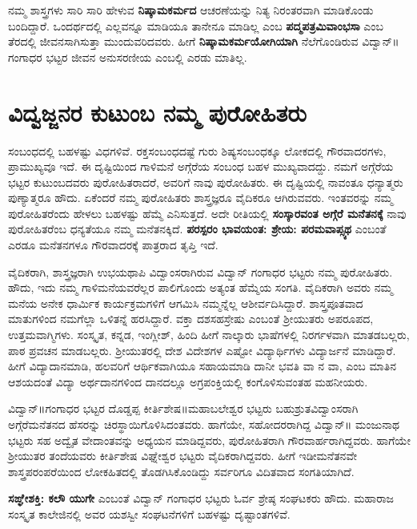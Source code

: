 {ನಮ್ಮ ಶಾಸ್ತ್ರಗಳು ಸಾರಿ  \enginline{-}  ಸಾರಿ ಹೇಳುವ \textbf{ನಿಷ್ಕಾಮಕರ್ಮದ} ಆಚರಣೆಯನ್ನು ನಿತ್ಯ  \enginline{-}  ನಿರಂತರವಾಗಿ ಮಾಡಿಕೊಂಡು ಬಂದಿದ್ದಾರೆ. ಒಂದರ್ಥದಲ್ಲಿ ಎಲ್ಲವನ್ನೂ ಮಾಡಿಯೂ ತಾನೇನೂ ಮಾಡಿಲ್ಲ ಎಂಬ \textbf{ಪದ್ಮಪತ್ರಮಿವಾಂಭಸಾ} ಎಂಬ ತೆರದಲ್ಲಿ ಜೀವನಸಾಗಿಸುತ್ತಾ ಮುಂದುವರಿದವರು. ಹೀಗೆ \textbf{ನಿಷ್ಕಾಮಕರ್ಮಯೋಗಿಯಾಗಿ} ನೆಲೆಗೊಂಡಿರುವ ವಿದ್ವಾನ್॥ಗಂಗಾಧರ ಭಟ್ಟರ ಜೀವನ ಅನುಸರಣೀಯ ಎಂಬಲ್ಲಿ ಎರಡು ಮಾತಿಲ್ಲ.

\section*{ವಿದ್ವಜ್ಜನರ ಕುಟುಂಬ   \enginline{-}   ನಮ್ಮ ಪುರೋಹಿತರು}

ಸಂಬಂಧದಲ್ಲಿ ಬಹಳಷ್ಟು ವಿಧಗಳಿವೆ. ರಕ್ತಸಂಬಂಧದಷ್ಟೆ ಗುರು  \enginline{-}  ಶಿಷ್ಯಸಂಬಂಧಕ್ಕೂ ಲೋಕದಲ್ಲಿ ಗೌರವಾದರಗಳು, ಪ್ರಾಮುಖ್ಯವೂ ಇದೆ. ಈ ದೃಷ್ಟಿಯಿಂದ ಗಾಳಿಮನೆ  \enginline{-}  ಅಗ್ಗೆರೆಯ ಸಂಬಂಧ ಬಹಳ ಮುಖ್ಯವಾದದ್ದು.  ನಮಗೆ ಅಗ್ಗೆರೆಯ ಭಟ್ಟರ ಕುಟುಂಬದವರು ಪುರೋಹಿತರಾದರೆ, ಅವರಿಗೆ ನಾವು ಪುರೋಹಿತರು. ಈ ದೃಷ್ಟಿಯಲ್ಲಿ ನಾವಂತೂ ಧನ್ಯಾತ್ಮರು  \enginline{-}  ಪುಣ್ಯಾತ್ಮರೂ ಹೌದು. ಏಕೆಂದರೆ ನಮ್ಮ ಪುರೋಹಿತರು ಶಾಸ್ತ್ರಜ್ಞರೂ  \enginline{-}  ವೈದಿಕರೂ ಆಗಿರುವವರು. ಇಂತವರನ್ನು ನಮ್ಮ ಪುರೋಹಿತರೆಂದು ಹೇಳಲು ಬಹಳಷ್ಟು ಹೆಮ್ಮೆ ಎನಿಸುತ್ತದೆ. ಅದೇ ರೀತಿಯಲ್ಲಿ \textbf{ಸಂಸ್ಕಾರವಂತ  \enginline{-}   ಅಗ್ಗೆರೆ ಮನೆತನಕ್ಕೆ} ನಾವು ಪುರೋಹಿತರೆಂಬ ಧನ್ಯತೆಯೂ ನಮ್ಮ ಮನೆತನಕ್ಕಿದೆ. \textbf{ಪರಸ್ಪರಂ ಭಾವಯಂತ: ಶ್ರೇಯ: ಪರಮವಾಪ್ಸ್ಯಥ}  ಎಂಬಂತೆ ಎರಡೂ ಮನೆತನಗಳೂ ಗೌರವಾದರಕ್ಕೆ ಪಾತ್ರರಾದ ತೃಪ್ತಿ ಇದೆ. 

ವೈದಿಕರಾಗಿ, ಶಾಸ್ತ್ರಜ್ಞರಾಗಿ ಉಭಯಥಾಪಿ ವಿದ್ವಾಂಸರಾಗಿರುವ ವಿದ್ವಾನ್ ಗಂಗಾಧರ ಭಟ್ಟರು ನಮ್ಮ ಪುರೋಹಿತರು. ಹೌದು, ಇದು ನಮ್ಮ ಗಾಳಿಮನೆಯವರೆಲ್ಲರ ಪಾಲಿಗೊಂದು ಅತ್ಯಂತ ಹೆಮ್ಮೆಯ ಸಂಗತಿ. ವೈದಿಕರಾಗಿ ಅವರು ನಮ್ಮ ಮನೆಯ ಅನೇಕ ಧಾರ್ಮಿಕ ಕಾರ್ಯಕ್ರಮಗಳಿಗೆ ಆಗಮಿಸಿ ನಮ್ಮನ್ನೆಲ್ಲ ಆಶೀರ್ವದಿಸಿದ್ದಾರೆ. ಶಾಸ್ತ್ರಪೂತವಾದ ಮಾತುಗಳಿಂದ ನಮಗೆಲ್ಲಾ ಒಳಿತನ್ನೆ ಹರಸಿದ್ದಾರೆ. ವಕ್ತಾ ದಶಸಹಸ್ರೇಷು ಎಂಬಂತೆ ಶ್ರೀಯುತರು ಅಪರೂಪದ, ಉತ್ತಮವಾಗ್ಮಿಗಳು. ಸಂಸ್ಕೃತ, ಕನ್ನಡ, ಇಂಗ್ಲೀಶ್, ಹಿಂದಿ ಹೀಗೆ ನಾಲ್ಕಾರು ಭಾಷೆಗಳಲ್ಲಿ ನಿರರ್ಗಳವಾಗಿ ಮಾತಡಬಲ್ಲರು, ಪಾಠ  \enginline{-}  ಪ್ರವಚನ ಮಾಡಬಲ್ಲರು. ಶ್ರೀಯುತರಲ್ಲಿ ದೇಶ  \enginline{-}  ವಿದೇಶಗಳ ಎಷ್ಟೋ ವಿದ್ಯಾರ್ಥಿಗಳು ವಿದ್ಯಾರ್ಜನೆ ಮಾಡಿದ್ದಾರೆ. ಹೀಗೆ ವಿದ್ಯಾದಾನಮಾಡಿ, ಹಲವರಿಗೆ ಆರ್ಥಿಕವಾಗಿಯೂ ಸಹಾಯಮಾಡಿ ದಾನೀ ಭವತಿ ವಾ ನ ವಾ,  ಎಂಬ ಮಾತಿನ ಆಶಯದಂತೆ ವಿದ್ಯಾ  \enginline{-}  ಅರ್ಥದಾನಗಳಿಂದ ದಾನದಲ್ಲೂ ಅಗ್ರಪಂಕ್ತಿಯಲ್ಲಿ ಕಂಗೊಳಿಸುವಂತಹ ಮಹನೀಯರು. 

ವಿದ್ವಾನ್॥ಗಂಗಾಧರ ಭಟ್ಟರ ದೊಡ್ಡಪ್ಪ ಕೀರ್ತಿಶೇಷ॥ಮಹಾಬಲೇಶ್ವರ ಭಟ್ಟರು ಬಹುಶ್ರುತವಿದ್ವಾಂಸರಾಗಿ ಅಗ್ಗೆರೆಮನೆತನದ ಹೆಸರನ್ನು ಚಿರಸ್ಥಾಯಿಗೊಳಿಸಿದಂತವರು. ಹಾಗೆಯೇ, ಸಹೋದರರಾಗಿದ್ದ ವಿದ್ವಾನ್॥ ಮಂಜುನಾಥ ಭಟ್ಟರು ಸಹ ಅದ್ವೈತ ವೇದಾಂತವನ್ನು ಅಧ್ಯಯನ ಮಾಡಿದ್ದವರು, ಪುರೋಹಿತರಾಗಿ ಗೌರವಾರ್ಹರಾಗಿದ್ದವರು. ಹಾಗೆಯೇ ಶ್ರೀಯುತರ ತಂದೆಯವರು ಕೀರ್ತಿಶೇಷ ವಿಘ್ನೇಶ್ವರ ಭಟ್ಟರು ವೈದಿಕರಾಗಿದ್ದವರು. ಹೀಗೆ ಇಡೀಮನೆತನವೇ ಶಾಸ್ತ್ರಪರಂಪರೆಯಿಂದ ಲೋಕಹಿತದಲ್ಲಿ ತೊಡಗಿಸಿಕೊಂಡಿದ್ದು ಸರ್ವರಿಗೂ ವಿದಿತವಾದ ಸಂಗತಿಯಾಗಿದೆ. 

\textbf{ಸಙ್ಘೇಶಕ್ತಿ: ಕಲೌ ಯುಗೇ} ಎಂಬಂತೆ ವಿದ್ವಾನ್ ಗಂಗಾಧರ ಭಟ್ಟರು ಓರ್ವ ಶ್ರೇಷ್ಠ ಸಂಘಟಕರು ಹೌದು. ಮಹಾರಾಜ ಸಂಸ್ಕೃತ ಕಾಲೇಜಿನಲ್ಲಿ ಅವರ ಯಶಸ್ವೀ ಸಂಘಟನೆಗಳಿಗೆ ಬಹಳಷ್ಟು ದೃಷ್ಟಾಂತಗಳಿವೆ. 

}
